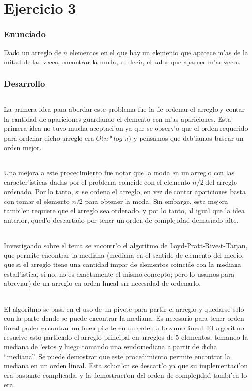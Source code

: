 \part{Ejercicio 3}
\section{Enunciado}
Dado un arreglo de $n$ elementos en el que hay un elemento que aparece m'as de la mitad de las 
veces, encontrar la moda, es decir, el valor que aparece m'as veces.

\section{Desarrollo}
\paragraph{}
La primera idea para abordar este problema fue la de ordenar el arreglo y contar la cantidad 
de apariciones guardando el elemento con m'as apariciones. Esta primera idea no tuvo mucha 
aceptaci'on ya que se observ'o que el orden requerido para ordenar dicho arreglo era $O(n*log$ $n)$ 
y pensamos que deb'iamos buscar un orden mejor.
\paragraph{}
Una mejora a este procedimiento fue notar que la moda en un arreglo con las caracter'isticas
dadas por el problema coincide con el elemento $n/2$ del arreglo ordenado. Por lo tanto, 
si se ordena el arreglo, en vez de contar apariciones basta con tomar el elemento $n/2$ para 
obtener la moda. Sin embargo, esta mejora tambi'en requiere que el arreglo sea ordenado, y por
lo tanto, al igual que la idea anterior, qued'o descartado por tener un orden de complejidad
demasiado alto.
\paragraph{}
Investigando sobre el tema se encontr'o el algoritmo de Loyd-Pratt-Rivest-Tarjan, que permite 
encontrar la mediana (mediana en el sentido de elemento del medio, que si el arreglo tiene una 
cantidad impar de elementos coincide con la mediana estad'istica, si no, no es exactamente el 
mismo concepto; pero lo usamos para abreviar) de un arreglo en orden lineal sin necesidad de ordenarlo.
\paragraph{}
El algoritmo se basa en el uso de un pivote para partir el arreglo y quedarse solo con la parte donde se 
puede encontrar la mediana. Es necesario para tener orden lineal poder encontrar un buen pivote 
en un orden a lo sumo lineal. El algoritmo resuelve esto partiendo el arreglo principal en arreglos
de 5 elementos, tomando la mediana de 'estos y luego tomando una seudomediana a partir de dicha ``mediana''. 
Se puede demostrar que este procedimiento permite encontrar la mediana en un orden lineal. Esta 
soluci'on se descart'o ya que su implementaci'on era bastante complicada, y la demostraci'on del orden de complejidad tambi'en lo era.
